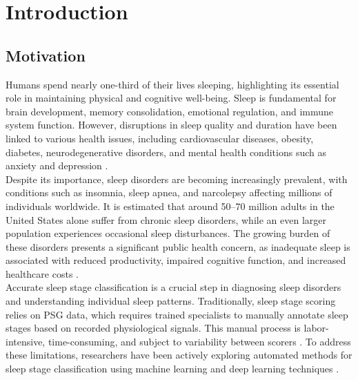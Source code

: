 \chapter{Introduction}

\section{Motivation}

Humans spend nearly one-third of their lives sleeping, highlighting its essential role in maintaining physical and cognitive well-being. Sleep is fundamental for brain development, memory consolidation, emotional regulation, and immune system function. However, disruptions in sleep quality and duration have been linked to various health issues, including cardiovascular diseases, obesity, diabetes, neurodegenerative disorders, and mental health conditions such as anxiety and depression \parencite{itani2017short}.\\

Despite its importance, sleep disorders are becoming increasingly prevalent, with conditions such as insomnia, sleep apnea, and narcolepsy affecting millions of individuals worldwide. It is estimated that around 50–70 million adults in the United States alone suffer from chronic sleep disorders, while an even larger population experiences occasional sleep disturbances. The growing burden of these disorders presents a significant public health concern, as inadequate sleep is associated with reduced productivity, impaired cognitive function, and increased healthcare costs \parencite{hirshkowitz2015national}.\\

Accurate sleep stage classification is a crucial step in diagnosing sleep disorders and understanding individual sleep patterns. Traditionally, sleep stage scoring relies on \ac{PSG} data, which requires trained specialists to manually annotate sleep stages based on recorded physiological signals. This manual process is labor-intensive, time-consuming, and subject to variability between scorers \parencite{yildirim2019deep}. To address these limitations, researchers have been actively exploring automated methods for sleep stage classification using machine learning and deep learning techniques \parencite{ardeshir2023sleep}.\\

